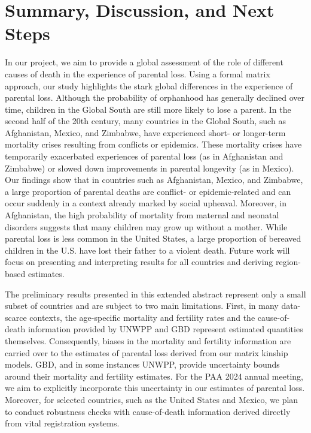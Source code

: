 \documentclass[
  11pt,
  letterpaper,
]{article}
\begin{document}
\hypertarget{summary-discussion-and-next-steps}{%
\section{Summary, Discussion, and Next Steps}\label{summary-discussion-and-next-steps}}

In our project, we aim to provide a global assessment of the role of different causes of death in the experience of parental loss. Using a formal matrix approach, our study highlights the stark global differences in the experience of parental loss. Although the probability of orphanhood has generally declined over time, children in the Global South are still more likely to lose a parent. In the second half of the 20th century, many countries in the Global South, such as Afghanistan, Mexico, and Zimbabwe, have experienced short- or longer-term mortality crises resulting from conflicts or epidemics. These mortality crises have temporarily exacerbated experiences of parental loss (as in Afghanistan and Zimbabwe) or slowed down improvements in parental longevity (as in Mexico). Our findings show that in countries such as Afghanistan, Mexico, and Zimbabwe, a large proportion of parental deaths are conflict- or epidemic-related and can occur suddenly in a context already marked by social upheaval. Moreover, in Afghanistan, the high probability of mortality from maternal and neonatal disorders suggests that many children may grow up without a mother. While parental loss is less common in the United States, a large proportion of bereaved children in the U.S. have lost their father to a violent death. Future work will focus on presenting and interpreting results for all countries and deriving region-based estimates.

The preliminary results presented in this extended abstract represent only a small subset of countries and are subject to two main limitations. First, in many data-scarce contexts, the age-specific mortality and fertility rates and the cause-of-death information provided by UNWPP and GBD represent estimated quantities themselves. Consequently, biases in the mortality and fertility information are carried over to the estimates of parental loss derived from our matrix kinship models. GBD, and in some instances UNWPP, provide uncertainty bounds around their mortality and fertility estimates. For the PAA 2024 annual meeting, we aim to explicitly incorporate this uncertainty in our estimates of parental loss. Moreover, for selected countries, such as the United States and Mexico, we plan to conduct robustness checks with cause-of-death information derived directly from vital registration systems.
\end{document}

